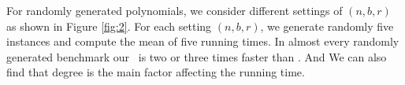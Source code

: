 %
%
%
%
%
%
%
%
%
%
%
%
%



For randomly generated polynomials, we consider different settings of
$(n,b,r)$ as shown in Figure \ref{fig:2}. For each setting $(n,b,r)$, we generate randomly five instances and  compute the mean of five running times. In almost every randomly generated benchmark our \froot\  is two or three times faster than \inte. And We can also  find that
degree is the main factor affecting the  running time.

